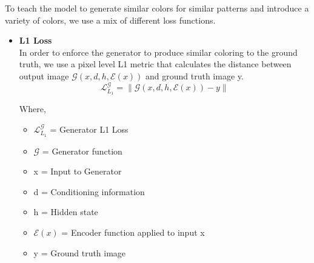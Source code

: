 To teach the model to generate similar colors for similar patterns and introduce a variety of colors, we use a mix of different loss functions.
\begin{itemize}
  \item \textbf{L1 Loss} \\
        In order to enforce the generator to produce similar coloring to the
        ground truth, we use a pixel level L1 metric that calculates the distance between
        output image $\mathcal{G}\left( x, d, h, \mathcal{E}\left( x \right)\right)$ and ground truth image y.
        \begin{equation}
          \mathcal{L}_{L_1}^\mathcal{G} = \|\mathcal{G}\left( x, d, h, \mathcal{E}\left( x \right)\right) - y \|
        \label{l1-loss}
        \end{equation}

        Where,
        \begin{itemize}
            \item $\mathcal{L}_{L_1}^\mathcal{G}$ = Generator L1 Loss
            \item $\mathcal{G}$ = Generator function
            \item x = Input to Generator
            \item d = Conditioning information
            \item h = Hidden state
            \item $\mathcal{E} (x)$ = Encoder function applied to input x
            \item y = Ground truth image
        \end{itemize}


      

\end{itemize}
